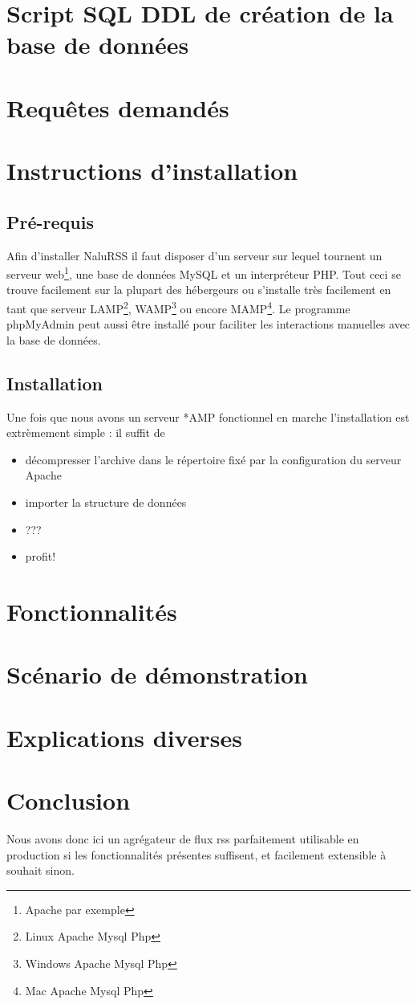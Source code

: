 \documentclass[11pt]{article}
\begin{document}
\section{Script SQL DDL de création de la base de données}

\section{Requêtes demandés}

\section{Instructions d'installation}
\subsection{Pré-requis}
Afin d'installer NaluRSS il faut disposer d'un serveur sur lequel tournent un serveur web\footnote{Apache par exemple}, une base de données MySQL et un interpréteur PHP. Tout ceci se trouve facilement sur la plupart des hébergeurs ou s'installe très facilement en tant que serveur LAMP\footnote{Linux Apache Mysql Php}, WAMP\footnote{Windows Apache Mysql Php} ou encore MAMP\footnote{Mac Apache Mysql Php}. Le programme phpMyAdmin peut aussi être installé pour faciliter les interactions manuelles avec la base de données.
\subsection{Installation}
Une fois que nous avons un serveur *AMP fonctionnel en marche l'installation est extrèmement simple : il suffit de 
\begin{itemize}
\item{décompresser l'archive dans le répertoire fixé par la configuration du serveur Apache}
\item{importer la structure de données}
\item{???}
\item{profit!}
\end{itemize}
\section{Fonctionnalités}

\section{Scénario de démonstration}

\section{Explications diverses}

\section{Conclusion}
Nous avons donc ici un agrégateur de flux rss parfaitement utilisable en production si les fonctionnalités présentes suffisent, et facilement extensible à souhait sinon.
\end{document}

